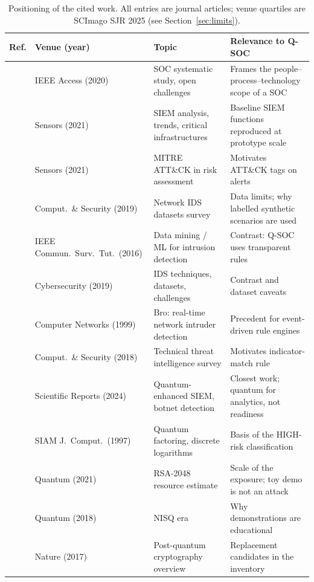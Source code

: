 \documentclass[conference]{IEEEtran}
\begin{document}
\begin{table}[t]
\caption{Positioning of the cited work. All entries are journal articles; venue quartiles are SCImago SJR 2025 (see Section~\ref{sec:limits}).}
\label{tab:related}
\centering
\footnotesize
\begin{tabular}{@{}l l l l@{}}
\toprule
Ref. & Venue (year) & Topic & Relevance to Q-SOC \\
\midrule
\cite{vielberth2020}   & IEEE Access (2020) & SOC systematic study, open challenges & Frames the people--process--technology scope of a SOC \\
\cite{gonzalez2021}    & Sensors (2021) & SIEM analysis, trends, critical infrastructures & Baseline SIEM functions reproduced at prototype scale \\
\cite{georgiadou2021}  & Sensors (2021) & MITRE ATT\&CK in risk assessment & Motivates ATT\&CK tags on alerts \\
\cite{ring2019}        & Comput.\ \& Security (2019) & Network IDS datasets survey & Data limits; why labelled synthetic scenarios are used \\
\cite{buczak2016}      & IEEE Commun.\ Surv.\ Tut.\ (2016) & Data mining / ML for intrusion detection & Contrast: Q-SOC uses transparent rules \\
\cite{khraisat2019}    & Cybersecurity (2019) & IDS techniques, datasets, challenges & Contrast and dataset caveats \\
\cite{paxson1999}      & Computer Networks (1999) & Bro: real-time network intruder detection & Precedent for event-driven rule engines \\
\cite{tounsi2018}      & Comput.\ \& Security (2018) & Technical threat intelligence survey & Motivates indicator-match rule \\
\cite{tehrani2024}     & Scientific Reports (2024) & Quantum-enhanced SIEM, botnet detection & Closest work; quantum for analytics, not readiness \\
\cite{shor1997}        & SIAM J.\ Comput.\ (1997) & Quantum factoring, discrete logarithms & Basis of the HIGH-risk classification \\
\cite{gidney2021}      & Quantum (2021) & RSA-2048 resource estimate & Scale of the exposure; toy demo is not an attack \\
\cite{preskill2018}    & Quantum (2018) & NISQ era & Why demonstrations are educational \\
\cite{bernstein2017}   & Nature (2017) & Post-quantum cryptography overview & Replacement candidates in the inventory \\

\end{tabular}
\end{table}
\end{document}
